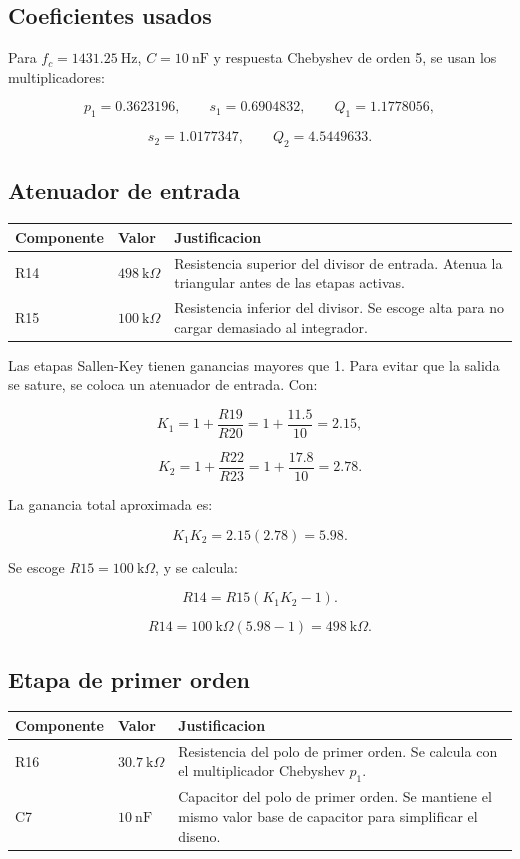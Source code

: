 ﻿\documentclass[11pt,letterpaper]{article}
\newcommand{\kohm}{\text{k}\Omega}
\begin{document}
\subsection{Coeficientes usados}

Para \(f_c=1431.25~\text{Hz}\), \(C=10~\text{nF}\) y respuesta Chebyshev de
orden 5, se usan los multiplicadores:

\[
p_1=0.3623196,
\qquad
s_1=0.6904832,
\qquad
Q_1=1.1778056,
\]

\[
s_2=1.0177347,
\qquad
Q_2=4.5449633.
\]

\subsection{Atenuador de entrada}

\begin{longtable}{p{2.0cm}p{4.2cm}p{8.7cm}}
\toprule
Componente & Valor & Justificacion \\
\midrule
\endhead
R14 & \(498~\kohm\) & Resistencia superior del divisor de entrada. Atenua la
triangular antes de las etapas activas. \\
R15 & \(100~\kohm\) & Resistencia inferior del divisor. Se escoge alta para
no cargar demasiado al integrador. \\
\bottomrule
\end{longtable}

Las etapas Sallen-Key tienen ganancias mayores que 1. Para evitar que la
salida se sature, se coloca un atenuador de entrada. Con:

\[
K_1=1+\frac{R19}{R20}=1+\frac{11.5}{10}=2.15,
\]

\[
K_2=1+\frac{R22}{R23}=1+\frac{17.8}{10}=2.78.
\]

La ganancia total aproximada es:

\[
K_1K_2=2.15(2.78)=5.98.
\]

Se escoge \(R15=100~\kohm\), y se calcula:

\[
R14=R15(K_1K_2-1).
\]

\[
R14=100~\kohm(5.98-1)=498~\kohm.
\]

\subsection{Etapa de primer orden}

\begin{longtable}{p{2.0cm}p{4.2cm}p{8.7cm}}
\toprule
Componente & Valor & Justificacion \\
\midrule
\endhead
R16 & \(30.7~\kohm\) & Resistencia del polo de primer orden. Se calcula con el
multiplicador Chebyshev \(p_1\). \\
C7 & \(10~\text{nF}\) & Capacitor del polo de primer orden. Se mantiene el
mismo valor base de capacitor para simplificar el diseno. \\
\bottomrule
\end{longtable}
\end{document}
